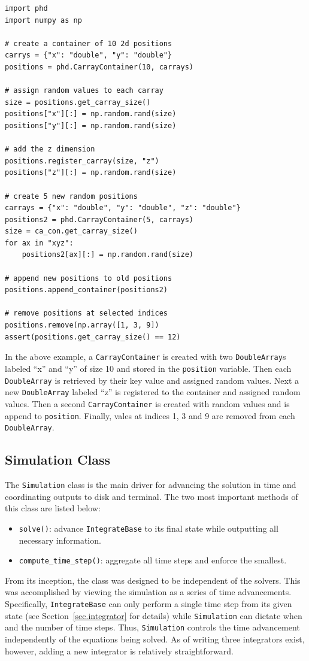 \begin{lstlisting}
import phd
import numpy as np

# create a container of 10 2d positions
carrys = {"x": "double", "y": "double"}
positions = phd.CarrayContainer(10, carrays)

# assign random values to each carray
size = positions.get_carray_size()
positions["x"][:] = np.random.rand(size)
positions["y"][:] = np.random.rand(size)

# add the z dimension
positions.register_carray(size, "z")
positions["z"][:] = np.random.rand(size)

# create 5 new random positions
carrays = {"x": "double", "y": "double", "z": "double"}
positions2 = phd.CarrayContainer(5, carrays)
size = ca_con.get_carray_size()
for ax in "xyz":
	positions2[ax][:] = np.random.rand(size)

# append new positions to old positions
positions.append_container(positions2)

# remove positions at selected indices
positions.remove(np.array([1, 3, 9])
assert(positions.get_carray_size() == 12)
\end{lstlisting}
In the above example, a \lstinline{CarrayContainer} is created with two \lstinline{DoubleArray}s
labeled ``x'' and ``y'' of size 10 and stored in the \lstinline{position} variable. Then each 
\lstinline{DoubleArray} is retrieved by their key value and assigned random values. Next a new 
\lstinline{DoubleArray} labeled ``z'' is registered to the container and assigned random values.
Then a second \lstinline{CarrayContainer} is created with random values and is append to
\lstinline{position}. Finally, vales at indices 1, 3 and 9 are removed from each \lstinline{DoubleArray}.

\subsection{Simulation Class}
The \lstinline{Simulation} class is the main driver for advancing the solution in time
and coordinating outputs to disk and terminal. The two most important methods of this
class are listed below:
\begin{itemize}
    \item \lstinline{solve()}: advance \lstinline{IntegrateBase} to its final state while
        outputting all necessary information. 
    \item \lstinline{compute_time_step()}: aggregate all time steps and enforce the smallest.
\end{itemize}
From its inception, the class was designed to be independent of the solvers.
This was accomplished by viewing the simulation as a series of time
advancements. Specifically, \lstinline{IntegrateBase} can only perform a single time step
from its given state (see Section~\ref{sec.integrator} for details) while \lstinline{Simulation}
can dictate when and the number of time steps. Thus, \lstinline{Simulation} controls the
time advancement independently of the equations being solved. As of writing three integrators
exist, however, adding a new integrator is relatively straightforward.

